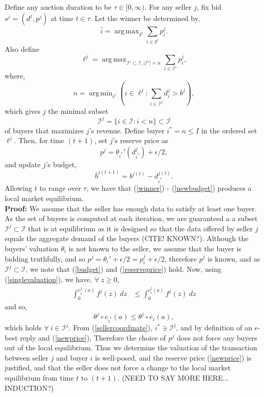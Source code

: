 \documentclass[12pt]{article}
\theoremstyle{definition}
\newcommand{\mcI}{\mathcal{I}}
\DeclareMathOperator*{\argmax}{arg\,max}
\DeclareMathOperator*{\argmin}{arg\,min}
\begin{document}
\begin{multicols}{2}
{
\label{sellerstrategy}
Define any auction duration to be $\tau \in [0,\infty)$. For any seller $j$,
fix bid $s^j=(d^j,p^j)$ at time $t\in\tau$.
Let the winner be determined by,
\begin{equation}\label{winner}
    \bar{i} = \displaystyle\argmax_{I^j}\sum_{i\in I^j} p_i^j.
\end{equation}
Also define
$$
    \ell^j =\argmax_{{\mcI}' \subset \mcI, \vert{\mcI}'\vert =
n}\sum_{i\in{\mcI}'} p_i^j,
$$
where,
\begin{equation}\label{sellercoordinate}
    n = \argmin_{\ell^j}(i \in \ell^j : \displaystyle\sum_{i\in\mcI^j} d_i^j >
b^j),
\end{equation} 
which gives $j$ the minimal subset 
\begin{equation}\label{buyers}
    \mcI^j = \lbrace i \in \mcI : i < n\rbrace \subset \mcI
\end{equation} 
of buyers that maximizes $j$'s revenue.
Define buyer $i^* = n \le I$ in the ordered set $\ell^j$.
Then, for time $(t+1)$, set $j$'s reserve price as 
\begin{equation}\label{newprice}
    p^j = \theta_{i^*}'(d_{i^*}^j) + \epsilon/2,
\end{equation}
and update $j$'s budget,
\begin{equation}\label{newbudget}
    \bar{b}^{j(t+1)} = b^{j(t)} - d_{i^*}^{j(t)}.
\end{equation}
Allowing $t$ to range over $\tau$, we have that (\ref{winner}) - (\ref{newbudget}) produces a local
market equilibrium.
}\\
\textbf{Proof:}
We assume that the seller has enough data to satisfy at least one buyer. As the
set of buyers is computed at each iteration, we are guaranteed a
a subset $\mcI^j \subset \mcI$ that is 
at equilibrium as it is designed so that the data offered by
seller $j$ equals the aggregate demand of the buyers (CITE! KNOWN?).
Although the buyers' valuation $\theta_i$ is not known to the seller, we assume
that the buyer is bidding truthfully, and so $p^j = {\theta_i}' + \epsilon/2
=p_i^j + \epsilon/2$, therefore $p^j$ is known, and as $\mcI^j\subset \mcI$, we
note that (\ref{budget}) and (\ref{reserveprice}) hold. Now, using
(\ref{singlevaluation}), we have, $\forall \ z\ge 0$,
\begin{align*}
    \int_0^{e_{i^*}^{j}(a)} f^{j}(z)\ dz &\le\int_0^{e_i^{j}(a)}
f^{j}(z) \ dz 
\end{align*}
and so,
$$
    \theta^j\circ e_{i^*}(a) \le \theta^j\circ e_i(a),
$$
which holds $\forall \ i \in \mcI^j$.
From (\ref{sellercoordinate}), $i^* \ni \mcI^j$, and by definition of an
$\epsilon$-best reply and (\ref{newprice}), 
Therefore the choice of $p^j$ does not force any buyers out of the local
equilibrium.
Thus we determine the valuation of the transaction between seller $j$ and buyer $i$ is well-posed,
and the reserve price (\ref{newprice}) is justified, and that the seller does
not force a change to the local market equilibrium from time $t$ to $(t+1)$.
(NEED TO SAY MORE HERE... INDUCTION?)



\end{multicols}
\end{document}
